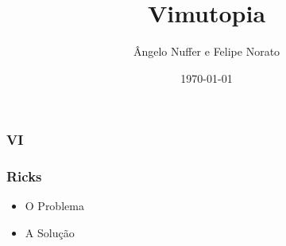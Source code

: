 \documentclass[]{beamer}
\title{Vimutopia}
\author{Ângelo Nuffer e Felipe Norato}
\institute{NSI-IFF}
\date{\today}
\begin{document}
\begin{frame}
    \titlepage
\end{frame}

\section[Ricks]{}

\begin{frame}
    \frametitle{VI}
    \begin{center}
    \end{center}
\end{frame}

\begin{frame}
    \frametitle{Ricks}
    \begin{itemize}
        \item<1-> O Problema
        \item<2-> A Solução
    \end{itemize}
\end{frame}

\section[Rocks]{}

\begin{frame}
    \begin{center}
    \end{center}
\end{frame}
\end{document}
